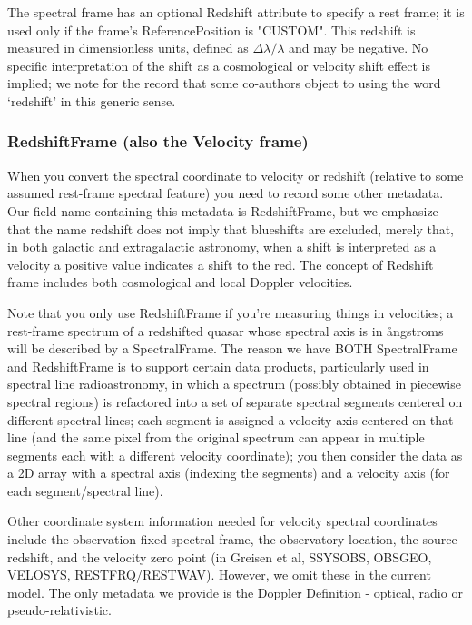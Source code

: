 \documentclass[11pt]{article}
\begin{document}
The spectral frame has an optional Redshift attribute to specify a rest
frame; it is used only if the frame's ReferencePosition is "CUSTOM".
This redshift is measured in dimensionless units, defined as
$\Delta\lambda/\lambda$ and may be negative. No specific interpretation
of the shift as a cosmological or velocity shift effect is implied;
we note for the record that some co-authors object to using the word `redshift'
in this generic sense.

\subsubsection{RedshiftFrame (also the Velocity frame)}

When you convert the spectral coordinate to velocity or redshift
(relative to some assumed rest-frame spectral feature) you need
to record some other metadata. Our field name containing this
metadata is RedshiftFrame, but we emphasize that the name redshift
does not imply that blueshifts are excluded, merely that, in both
galactic and extragalactic astronomy, when a shift is interpreted
as a velocity a positive value indicates a shift to the red.
The concept of Redshift frame includes both cosmological and
local Doppler velocities.

Note that you only use RedshiftFrame if you're measuring things
in velocities; a rest-frame spectrum of a redshifted quasar
whose spectral axis is in {\aa}ngstroms will be described by a SpectralFrame.
The reason we have BOTH SpectralFrame and RedshiftFrame is to support
certain data products, particularly used in spectral line radioastronomy,
in which a spectrum (possibly obtained in piecewise spectral regions)
is refactored into a set of separate spectral segments 
centered on different spectral lines; each segment is assigned a velocity
axis centered on that line (and the same pixel from the original spectrum
can appear in multiple segments each with a different velocity coordinate);
you then consider the data as a 2D array with a spectral axis (indexing the
segments) and a velocity axis (for each segment/spectral line).

Other coordinate system information needed for velocity spectral coordinates
include the observation-fixed spectral frame, the observatory location,
the source redshift, and the velocity zero point (in Greisen et al,
SSYSOBS, OBSGEO, VELOSYS, RESTFRQ/RESTWAV). However, we omit these
in the current model.
The only metadata we provide is the Doppler Definition - optical,
radio or pseudo-relativistic.
\end{document}
